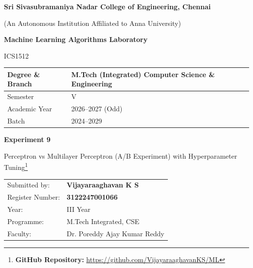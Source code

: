 \documentclass[11pt,a4paper]{article}
\title{}
\date{}
\begin{document}
\begin{titlepage}
\centering
\vspace*{1cm}
{\Large\bfseries Sri Sivasubramaniya Nadar College of Engineering, Chennai\par}
\vspace{0.2cm}
{\normalsize (An Autonomous Institution Affiliated to Anna University)\par}
\vspace{1.2cm}

{\Large\bfseries Machine Learning Algorithms Laboratory\par}
\vspace{0.3cm}
{\large ICS1512\par}
\vspace{1.5cm}

\begin{tabular}{|p{5.5cm}|p{7cm}|}
\hline
Degree \& Branch & M.Tech (Integrated) Computer Science \& Engineering \\
\hline
Semester & V \\
\hline
Academic Year & 2026--2027 (Odd) \\
\hline
Batch & 2024--2029 \\
\hline
\end{tabular}

\vspace{1.8cm}
{\Large\bfseries Experiment 9\par}
\vspace{0.3cm}
{\large Perceptron vs Multilayer Perceptron (A/B Experiment) with Hyperparameter Tuning\footnote{\textbf{GitHub Repository: }\url{https://github.com/VijayaraaghavanKS/ML}}\par}
\vspace{2.5cm}

\begin{tabular}{ll}
Submitted by: & \textbf{Vijayaraaghavan K S} \\[4pt]
Register Number: & \textbf{3122247001066} \\[4pt]
Year: & III Year \\[4pt]
Programme: & M.Tech Integrated, CSE \\[4pt]
Faculty: & Dr. Poreddy Ajay Kumar Reddy \\[4pt]
\end{tabular}

\vfill
\end{titlepage}

\tableofcontents
\newpage
\end{document}
